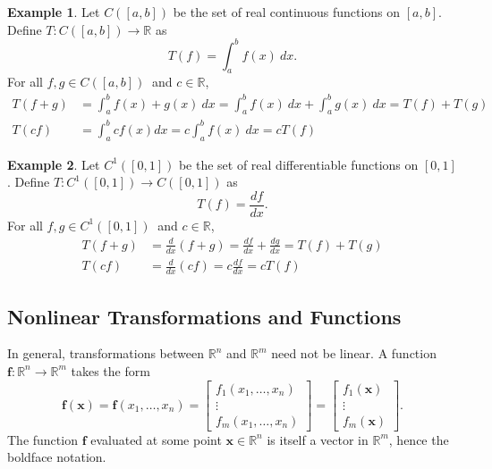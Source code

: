 \documentclass{article}
\newcommand{\R}{\mathbb{R}}
\newcommand{\x}{\mathbf{x}}
\newcommand{\f}{\mathbf{f}}
\theoremstyle{definition}
\newtheorem{example}{Example}[section]
\begin{document}
	\begin{example}
		Let $ C([a,b]) $ be the set of real continuous functions on $ [a,b] $. Define $ T:C([a,b])\to \R $ as $$T(f)=\int_{a}^{b}f(x)\ dx .$$
		For all $ f,g\in C([a,b])\  $ and $ c\in\R $, 
		\begin{align*}
			T(f+g)&= \int_{a}^{b}f(x) +g(x)\ dx = \int_{a}^{b}f(x)\ dx + \int_{a}^{b}g(x)\ dx = T(f) + T(g) \\
			T(cf)&= \int_{a}^{b}cf(x)dx = c\int_{a}^{b}f(x)\ dx = cT(f)
		\end{align*}
	\end{example}
	\begin{example}
		Let $ C^1([0,1]) $ be the set of real differentiable functions on $ [0,1] $. Define $ T:C^1([0,1])\to C([0,1])  $  as $$ T(f)=\frac{df}{dx}. $$
		For all $ f,g\in C^1([0,1])\  $ and $ c\in\R $, 
		\begin{align*}
			T(f+g)&=\frac{d}{dx}(f+g) = \frac{df}{dx} + \frac{dg}{dx} = T(f) + T(g)\\
			T(cf) & = \frac{d}{dx}(cf)= c\frac{df}{dx} = cT(f)
		\end{align*}
	\end{example}
	\subsection{Nonlinear Transformations and Functions}
	In general, transformations between $ \R^n $ and $ \R^m $ need not be linear. A function $ \f:\R^n\to\R^m $ takes the form 
	$$\f(\x)=\f(x_1,\ldots,x_n) = \begin{bmatrix}
		f_1(x_1,\ldots,x_n)\\\vdots\\f_m(x_1,\ldots,x_n)
	\end{bmatrix} = \begin{bmatrix}
		f_1(\x)\\\vdots\\f_m(\x)
	\end{bmatrix}.$$ The function $ \f $ evaluated at some point $ \x\in\R^n $ is itself a vector in $ \R^m $, hence the boldface notation. 
	
\end{document}
